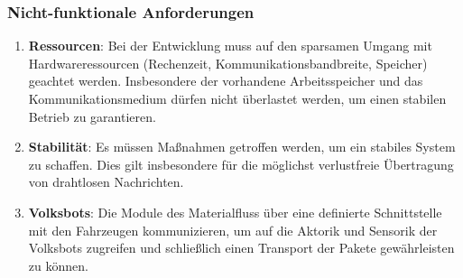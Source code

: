 \subsubsection{Nicht-funktionale Anforderungen}
\begin{enumerate}
\item \textbf{Ressourcen}: Bei der Entwicklung muss 
auf den sparsamen Umgang mit Hardwareressourcen (Rechenzeit, Kommunikationsbandbreite, Speicher) geachtet werden. Insbesondere der vorhandene Arbeitsspeicher und das Kommunikationsmedium dürfen nicht überlastet werden, um einen stabilen Betrieb zu garantieren. 
\item \textbf{Stabilität}: Es müssen Maßnahmen getroffen werden, um ein stabiles System zu schaffen. Dies gilt insbesondere für die möglichst verlustfreie Übertragung von drahtlosen Nachrichten.
\item \textbf{Volksbots}: Die Module des Materialfluss über eine definierte Schnittstelle mit den Fahrzeugen kommunizieren, um auf die Aktorik und Sensorik der Volksbots zugreifen und schließlich einen Transport der Pakete gewährleisten zu können.
\end{enumerate}